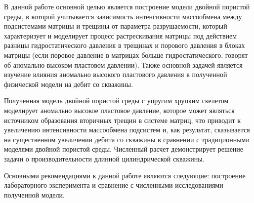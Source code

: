 
{\annotationtext} В данной работе основной целью является построение модели двойной пористой среды, в которой учитывается зависимость интенсивности массообмена между подсистемами матрицы и трещины от параметра разрушаемости, который характеризует и моделирует процесс растрескивания матрицы под действием разницы гидростатического давления в трещинах и порового давления в блоках матрицы (если поровое давление в матрицах больше гидростатического, говорят об аномально высоком пластовом давлении). Также основной задачей является изучение влияния аномально высокого пластового давления в полученной физической модели на дебит со скважины.

Полученная модель двойной пористой среды с упругим хрупким скелетом моделирует аномально высокое пластовое давление, которое может являться источником образования вторичных трещин в системе матриц, что приводит к увеличению интенсивности массообмена подсистем и, как результат, сказывается на существенном увеличении дебита со скважины в сравнении с традиционными моделями двойной пористой среды. Численный расчет демонстрирует решение задачи о производительности длинной цилиндрической скважины.

Основными рекомендациями к данной работе являются следующие: построение лабораторного эксперимента и сравнение с численными исследованиями полученной модели.

